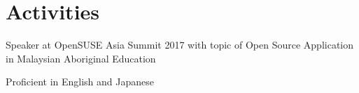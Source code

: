 \documentclass[letterpaper]{article}
\def\footerlink{http://github.com/alapha23/}
\renewenvironment{itemize}{
  \begin{list}{}{
    \setlength{\leftmargin}{1.5em}
  }
}{
  \end{list}
}
\begin{document}
\section*{Activities}

\begin{itemize}
\item Speaker at OpenSUSE Asia Summit 2017 with topic of Open Source Application in Malaysian Aboriginal Education 
\end{itemize}

\begin{itemize}
\item Proficient in English and Japanese 
\end{itemize}

%
%

%

\bigskip

\end{document}
